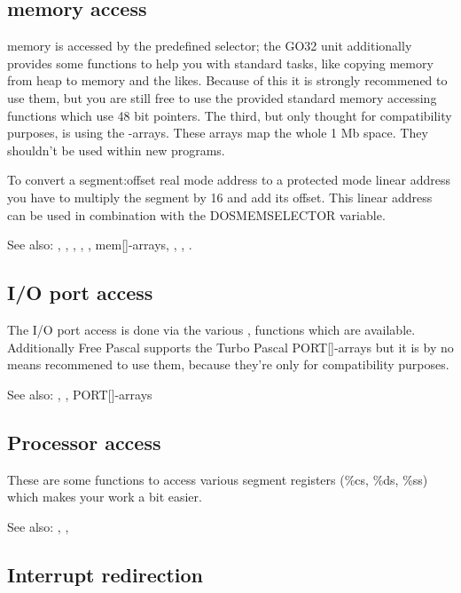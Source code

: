 \subsection{\dos memory access}


\dos memory is accessed by the predefined  selector; 
the GO32 unit additionally provides some functions to help you with standard tasks,
like copying memory from heap to \dos memory and the likes. Because of this
it is strongly recommened to use them, but you are still free to use the
provided standard memory accessing functions which use 48 bit pointers. The
third, but only thought for compatibility purposes, is using the
-arrays. These arrays map the whole 1 Mb \dos space. They shouldn't be
used within new programs.

To convert a segment:offset real mode address to a protected mode linear
address you have to multiply the segment by 16 and add its offset. This
linear address can be used in combination with the DOSMEMSELECTOR variable.

See also: 
,
,
,
,
,
mem[]-arrays, 
,
,
. 

\subsection{I/O port access}

The I/O port access is done via the various , 
functions
which are available. Additionally Free Pascal supports the Turbo Pascal
PORT[]-arrays but it is by no means recommened to use them, because they're
only for compatibility purposes.

See also: , , PORT[]-arrays

\subsection{Processor access}

These are some functions to access various segment registers (\%cs, \%ds, \%ss)
which makes your work a bit easier.

See also: , , 

\subsection{Interrupt redirection}

